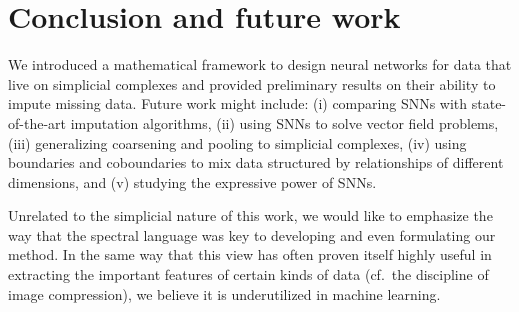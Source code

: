 \section{Conclusion and future work}

We introduced a mathematical framework to design neural networks for data that live on simplicial complexes and provided preliminary results on their ability to impute missing data.
Future work might include:
(i) comparing SNNs with state-of-the-art imputation algorithms,
(ii) using SNNs to solve vector field problems,
(iii) generalizing coarsening and pooling to simplicial complexes,
(iv) using boundaries and coboundaries to mix data structured by relationships of different dimensions,
and (v) studying the expressive power of SNNs.

Unrelated to the simplicial nature of this work, we would like to emphasize the way that the spectral language was key to developing and even formulating our method. In the same way that this view has often proven itself highly useful in extracting the important features of certain kinds of data (cf.\ the discipline of image compression), we believe it is underutilized in machine learning.
